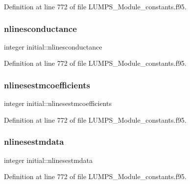Definition at line 772 of file L\+U\+M\+P\+S\+\_\+\+Module\+\_\+constants.\+f95.

\mbox{\label{namespaceinitial_ab8823ecdd51c6ba0d2a52a111a1c95f4}} 
\subsubsection{\texorpdfstring{nlinesconductance}{nlinesconductance}}
{\footnotesize\ttfamily integer initial\+::nlinesconductance}



Definition at line 772 of file L\+U\+M\+P\+S\+\_\+\+Module\+\_\+constants.\+f95.

\mbox{\label{namespaceinitial_ab25a9647691a26042f69a1cd4c71dbc5}} 
\subsubsection{\texorpdfstring{nlinesestmcoefficients}{nlinesestmcoefficients}}
{\footnotesize\ttfamily integer initial\+::nlinesestmcoefficients}



Definition at line 772 of file L\+U\+M\+P\+S\+\_\+\+Module\+\_\+constants.\+f95.

\mbox{\label{namespaceinitial_a60bf0e6edcda66939777e00a471d6441}} 
\subsubsection{\texorpdfstring{nlinesestmdata}{nlinesestmdata}}
{\footnotesize\ttfamily integer initial\+::nlinesestmdata}



Definition at line 772 of file L\+U\+M\+P\+S\+\_\+\+Module\+\_\+constants.\+f95.

\mbox{\label{namespaceinitial_a06034898c756c3397298055a77d34c08}} 
